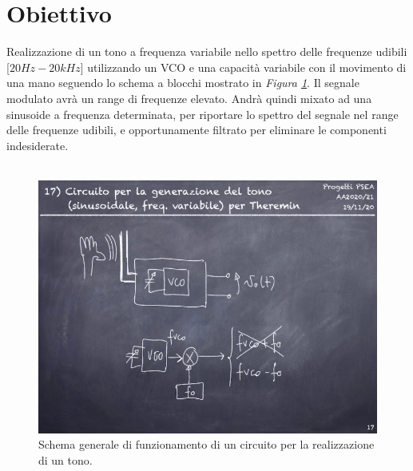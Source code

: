 \documentclass[titlepage]{report}
\begin{document}
	

\begin{frontespizio}
\end{frontespizio}
	
\tableofcontents

\chapter*{Obiettivo}
	\label{ch:Scope}
	\large Realizzazione di un tono a frequenza variabile nello spettro delle frequenze udibili [$20Hz - 20kHz$] utilizzando un VCO e una capacità variabile con il movimento di una mano seguendo lo schema a blocchi mostrato in \textit{Figura \ref{fig:Schema_Assegnazione}}. Il segnale modulato avrà un range di frequenze elevato. Andrà quindi mixato ad una sinusoide a frequenza determinata, per riportare lo spettro del segnale nel range delle frequenze udibili, e opportunamente filtrato per eliminare le componenti indesiderate.
	\\
	\\
	\begin{figure}[h]
		\centering
		\includegraphics[scale=0.5]{Immagini/Schema_progetto_17.png}
		\caption{Schema generale di funzionamento di un circuito per la realizzazione di un tono.}
		\label{fig:Schema_Assegnazione}
	\end{figure}
\end{document}
